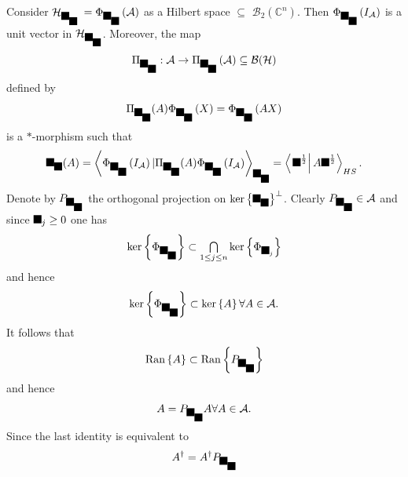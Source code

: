 \documentclass[aps,preprint]{revtex4}%
\providecommand{\U}[1]{\protect\rule{.1in}{.1in}}
\begin{document}
Consider $\mathcal{H}_{\U{3c9} _{\U{3c1} }}$ $=\Phi_{\U{3c9} _{\U{3c1} }%
}\left(  \mathcal{A}\right)  $ as a Hilbert space $\subseteq$ $\mathcal{B}%
_{2}(\mathbb{C}^{n})$. Then $\Phi_{\U{3c9} _{\U{3c1} }}\left(  I_{\mathcal{A}%
}\right)  $ is a unit vector in $\mathcal{H}_{\U{3c9} _{\U{3c1} }}$. Moreover,
the map
\begin{equation}
\Pi_{\U{3c9} _{\U{3c1} }}:\mathcal{A}\rightarrow\Pi_{\U{3c9} _{\U{3c1} }%
}\left(  \mathcal{A}\right)  \subseteq\mathcal{B(H)}%
\end{equation}
defined by
\begin{equation}
\Pi_{\U{3c9} _{\U{3c1} }}(A)\Phi_{\U{3c9} _{\U{3c1} }}\left(  X\right)
=\Phi_{\U{3c9} _{\U{3c1} }}\left(  AX\right)
\end{equation}
is a $\ast$-morphism such that
\begin{equation}
\U{3c9} _{\U{3c1} }(A)=\left\langle \Phi_{\U{3c9} _{\U{3c1} }}\left(
I_{\mathcal{A}}\right)  |\Pi_{\U{3c9} _{\U{3c1} }}(A)\Phi_{\U{3c9} _{\U{3c1}
}}\left(  I_{\mathcal{A}}\right)  \right\rangle _{\U{3c9} _{\U{3c1} }%
}=\left\langle \left.  \U{3c1} ^{\frac{1}{2}}\right\vert A\U{3c1} ^{\frac
{1}{2}}\right\rangle _{HS}.
\end{equation}
Denote by $P_{\U{3c9} _{\U{3c1} }}$ the orthogonal projection on $\ker\left\{
\U{3c9} _{\U{3c1} }\right\}  ^{\perp}$. Clearly $P_{\U{3c9} _{\U{3c1} }}%
\in\mathcal{A}$ and since $\U{3c1} _{j}\geq0$ one has%
\begin{equation}
\ker\left\{  \Phi_{\U{3c9} _{\U{3c1} }}\right\}  \subset%
{\textstyle\bigcap\limits_{1\leq j\leq n}}
\ker\left\{  \Phi_{\U{3c1} _{j}}\right\}
\end{equation}
and hence
\begin{equation}
\ker\left\{  \Phi_{\U{3c9} _{\U{3c1} }}\right\}  \subset\ker\left\{
A\right\}  \forall A\in\mathcal{A}.
\end{equation}
It follows that
\begin{equation}
\operatorname{Ran}\left\{  A\right\}  \subset\operatorname{Ran}\left\{
P_{\U{3c9} _{\U{3c1} }}\right\}
\end{equation}
and hence
\begin{equation}
A=P_{\U{3c9} _{\U{3c1} }}A\forall A\in\mathcal{A}.
\end{equation}
Since the last identity is equivalent to
\begin{equation}
A^{\dagger}=A^{\dagger}P_{\U{3c9} _{\U{3c1} }}%
\end{equation}
\end{document}
